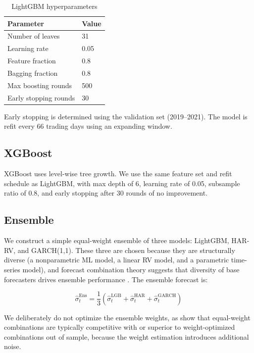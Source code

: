 \begin{table}[H]
\centering
\caption{LightGBM hyperparameters}
\label{tab:lgb_params}
\small
\begin{tabular}{l l}
\toprule
\textbf{Parameter} & \textbf{Value} \\
\midrule
Number of leaves & 31 \\
Learning rate & 0.05 \\
Feature fraction & 0.8 \\
Bagging fraction & 0.8 \\
Max boosting rounds & 500 \\
Early stopping rounds & 30 \\
\bottomrule
\end{tabular}
\end{table}

Early stopping is determined using the validation set (2019--2021). The model is refit every 66 trading days using an expanding window.

\subsection{XGBoost}

XGBoost \citep{Chen2016} uses level-wise tree growth. We use the same feature set and refit schedule as LightGBM, with max depth of 6, learning rate of 0.05, subsample ratio of 0.8, and early stopping after 30 rounds of no improvement.

\subsection{Ensemble}

We construct a simple equal-weight ensemble of three models: LightGBM, HAR-RV, and GARCH(1,1). These three are chosen because they are structurally diverse (a nonparametric ML model, a linear RV model, and a parametric time-series model), and forecast combination theory suggests that diversity of base forecasters drives ensemble performance \citep{Timmermann2006}. The ensemble forecast is:

\begin{equation}
    \hat{\sigma}_t^{\text{Ens}} = \frac{1}{3}\left(\hat{\sigma}_t^{\text{LGB}} + \hat{\sigma}_t^{\text{HAR}} + \hat{\sigma}_t^{\text{GARCH}}\right)
\end{equation}

We deliberately do not optimize the ensemble weights, as \citet{Patton2019} show that equal-weight combinations are typically competitive with or superior to weight-optimized combinations out of sample, because the weight estimation introduces additional noise.


